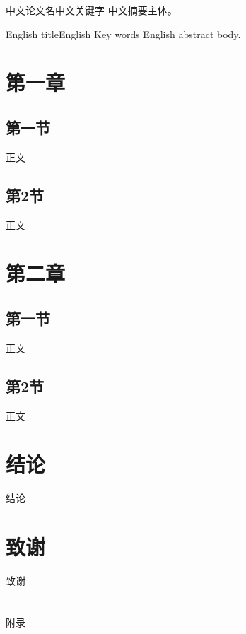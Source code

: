 \documentclass{ctexhrbust}
\begin{document}
%

\begin{zh_abstract}{中文论文名}{中文关键字}
  中文摘要主体。
\end{zh_abstract}
\begin{en_abstract}{English title}{English Key words}
  English abstract body.
\end{en_abstract}



\newpage
\tableofcontents

\newpage
\chapter{第一章}
\section{第一节}
正文
\section{第2节}
正文
\chapter{第二章}
\section{第一节}
正文
\section{第2节}
正文

\chapter*{结论}
结论
\chapter*{致谢}
致谢
\newpage
{}
\nocite{*}
%

\renewcommand\HrbustBeforeChapter{附录}
\renewcommand\HrbustAfterChapter{}
\appendix
\chapter{}
附录
%
\end{document}
